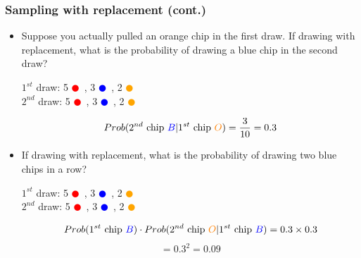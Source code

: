 \documentclass[notes,11pt, aspectratio=169]{beamer}
\begin{document}

\begin{frame}
\frametitle{Sampling with replacement (cont.)}

\begin{itemize}

\item Suppose you actually pulled an orange chip in the first draw. If drawing with replacement, what is the probability of drawing a blue chip in the second draw?

\pause

\begin{center}
$1^{st}$ draw: 5 \textcolor{red}{$\CIRCLE$}~, 3 \textcolor{blue}{$\CIRCLE$}~, 2 \textcolor{orange}{$\CIRCLE$} \\
\pause
$2^{nd}$ draw: 5 \textcolor{red}{$\CIRCLE$}~, 3 \textcolor{blue}{$\CIRCLE$}~, 2 \textcolor{orange}{$\CIRCLE$}
\end{center}
\pause
\[ Prob(2^{nd} \text{ chip } \textcolor{blue}{B} | 1^{st} \text{ chip } \textcolor{orange}{O}) = \frac{3}{10} = 0.3 \]

\pause
\item If drawing with replacement, what is the probability of drawing two blue chips in a row?
\begin{center}

\pause
$1^{st}$ draw: 5 \textcolor{red}{$\CIRCLE$}~, 3 \textcolor{blue}{$\CIRCLE$}~, 2 \textcolor{orange}{$\CIRCLE$} \\
$2^{nd}$ draw: 5 \textcolor{red}{$\CIRCLE$}~, 3 \textcolor{blue}{$\CIRCLE$}~, 2 \textcolor{orange}{$\CIRCLE$}
\end{center}
\pause
\[ Prob(1^{st} \text{ chip } \textcolor{blue}{B}) \cdot Prob(2^{nd} \text{ chip } \textcolor{orange}{O} | 1^{st} \text{ chip } \textcolor{blue}{B}) = 0.3 \times 0.3 \]
\[ = 0.3^2 = 0.09 \]

\end{itemize}

\end{frame}

\end{document}
